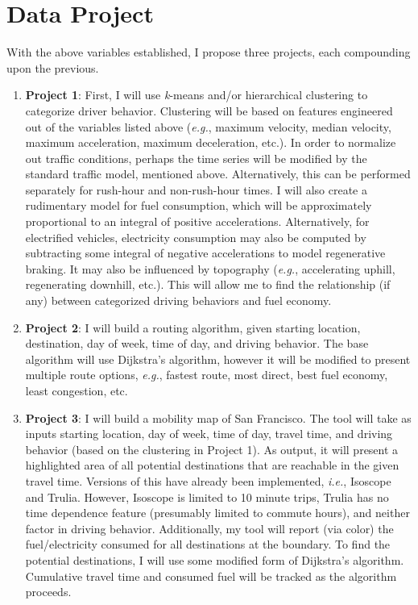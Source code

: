\documentclass[12pt]{article}
\begin{document}
\section{Data Project}

With the above variables established, I propose three projects, each compounding upon the previous.

\begin{enumerate}

\item \textbf{Project 1}: First, I will use \textit{k}-means and/or hierarchical clustering to categorize driver behavior. Clustering will be based on features engineered out of the variables listed above (\textit{e.g.}, maximum velocity, median velocity, maximum acceleration, maximum deceleration, etc.). In order to normalize out traffic conditions, perhaps the time series will be modified by the standard traffic model, mentioned above. Alternatively, this can be performed separately for rush-hour and non-rush-hour times. I will also create a rudimentary model for fuel consumption, which will be approximately proportional to an integral of positive accelerations. Alternatively, for electrified vehicles, electricity consumption may also be computed by subtracting some integral of negative accelerations to model regenerative braking. It may also be influenced by topography (\textit{e.g.}, accelerating uphill, regenerating downhill, etc.). This will allow me to find the relationship (if any) between categorized driving behaviors and fuel economy.

\item \textbf{Project 2}: I will build a routing algorithm, given starting location, destination, day of week, time of day, and driving behavior. The base algorithm will use Dijkstra's algorithm, however it will be modified to present multiple route options, \textit{e.g.}, fastest route, most direct, best fuel economy, least congestion, etc.

\item \textbf{Project 3}: I will build a mobility map of San Francisco. The tool will take as inputs starting location, day of week, time of day, travel time, and driving behavior (based on the clustering in Project 1). As output, it will present a highlighted area of all potential destinations that are reachable in the given travel time. Versions of this have already been implemented, \textit{i.e.}, Isoscope and Trulia. However, Isoscope is limited to 10 minute trips, Trulia has no time dependence feature (presumably limited to commute hours), and neither factor in driving behavior. Additionally, my tool will report (via color) the fuel/electricity consumed for all destinations at the boundary. To find the potential destinations, I will use some modified form of Dijkstra's algorithm. Cumulative travel time and consumed fuel will be tracked as the algorithm proceeds.

\end{enumerate}
\end{document}
